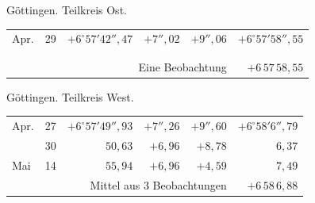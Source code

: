 \noindent\begin{minipage}[t]{.495\textwidth}\centering Göttingen. Teilkreis Ost.\par\smallskip
{\scriptsize\setlength{\tabcolsep}{1pt}\renewcommand{\arraystretch}{1.2}\begin{tabular}{lr|r|r|r|r|}
Apr.&29&$+6^\circ57'42''{,}47$&$+7''{,}02$&$+9''{,}06$&$+6^\circ57'58''{,}55$\\
&&&&&\\
&&&&&\\
\cline{6-6}\multicolumn{5}{r}{Eine Beobachtung}&$+6\,57\,58{,}55$
\end{tabular}}\end{minipage}\hfill\begin{minipage}[t]{.495\textwidth}\centering Göttingen. Teilkreis West.\par\smallskip
{\scriptsize\setlength{\tabcolsep}{1pt}\renewcommand{\arraystretch}{1.2}\begin{tabular}{lr|r|r|r|r}
Apr.&27&$+6^\circ57'49''{,}93$&$+7''{,}26$&$+9''{,}60$&$+6^\circ58'6''{,}79$\\
&30&$50{,}63$&$+6{,}96$&$+8{,}78$&$6{,}37$\\
Mai&14&$55{,}94$&$+6{,}96$&$+4{,}59$&$7{,}49$\\
\cline{6-6}\multicolumn{5}{r}{Mittel aus 3 Beobachtungen}&$+6\,58\,6{,}88$
\end{tabular}}\end{minipage}
\par\vspace{4mm}

